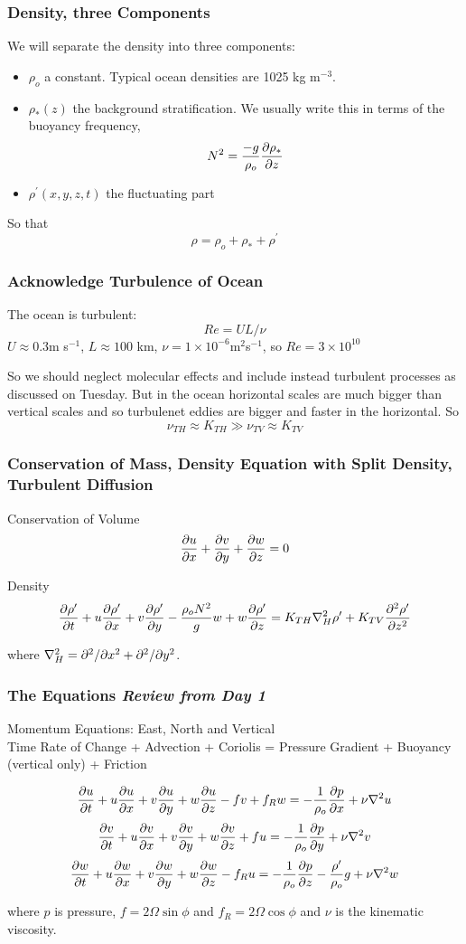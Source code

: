 \documentclass[xcolor=dvipsnames]{beamer}
\begin{document}
\begin{frame}
\frametitle{Density, three Components}

We will separate the density into three components:
\begin{itemize}
\item $\rho_o$ a constant.  Typical ocean densities are 1025 kg m$^{-3}$. 
\item $\rho_*(z)$ the background stratification.  We usually write this in terms of the buoyancy frequency, \[ N^2 = \frac{-g}{\rho_o} \frac{\partial \rho_*}{\partial z} \]
\item $\rho^{\prime}(x,y,z,t)$ the fluctuating part
\end{itemize}
So that
\[ \rho = \rho_o + \rho_* + \rho^{\prime} \]
\end{frame}
\begin{frame}

\frametitle{Acknowledge Turbulence of Ocean}

The ocean is turbulent: 
\[ Re = UL/\nu\]
$U \approx 0.3$m s$^{-1}$, $L \approx 100$ km, $\nu = 1 \times 10^{-6}$m$^2$s$^{-1}$, so $Re = 3 \times 10^{10}$

So we should neglect molecular effects and include instead turbulent processes as discussed on Tuesday.  But in the ocean horizontal scales are much bigger than vertical scales and so turbulenet eddies are bigger and faster in the horizontal. So
\[ \nu_{TH} \approx K_{TH}  \gg \nu_{TV} \approx K_{TV}\]
\end{frame}

\begin{frame}
\frametitle{Conservation of Mass, Density Equation with Split Density, Turbulent Diffusion}
Conservation of Volume\\
\[ \frac {\partial u}{\partial x} + \frac {\partial v}{\partial y} + \frac {\partial w}{\partial z} = 0 \]

Density\\
\[ \frac{\partial\rho^\prime}{\partial t} + u \frac{\partial\rho^\prime}{\partial x} + v \frac{\partial\rho^\prime}{\partial y} -  \frac{\rho_o N^2}g w + w \frac{\partial\rho^\prime}{\partial z} = K_{TH} \nabla_H^2 \rho^\prime + K_{TV}\frac{\partial^2 \rho^\prime}{\partial z^2} \]

where $\nabla_H^2 = \partial^2/\partial x^2 + \partial^2/\partial y^2$.
\end{frame}

\begin{frame}
  \frametitle{The Equations {\it Review from Day 1}}   %
Momentum Equations: East, North and Vertical\\
Time Rate of Change + Advection + Coriolis = Pressure Gradient + Buoyancy (vertical only) + Friction


\[ \frac {\partial u}{\partial t} + u \frac {\partial u}{\partial x} + v \frac {\partial u}{\partial y} + w \frac {\partial u}{\partial z} -fv +f_R w = -\frac{1}{\rho_o} \frac {\partial p}{\partial x} + \nu \nabla^2 u\] 
\[ \frac {\partial v}{\partial t} + u \frac {\partial v}{\partial x} + v \frac {\partial v}{\partial y} + w\frac {\partial v}{\partial z} + fu = -\frac{1}{\rho_o} \frac {\partial p}{\partial y} + \nu \nabla^2 v\]
\[ \frac {\partial w}{\partial t} + u \frac {\partial w}{\partial x} + v \frac {\partial w}{\partial y} + w \frac {\partial w}{\partial z} - f_R u = -\frac{1}{\rho_o} \frac {\partial p}{\partial z} - \frac{\rho^\prime}{\rho_o}g + \nu \nabla^2 w \]

where $p$ is pressure, $f = 2\Omega \sin \phi$ and $f_R = 2 \Omega \cos \phi$ and $\nu$ is the kinematic viscosity.

\end{frame}
\end{document}
